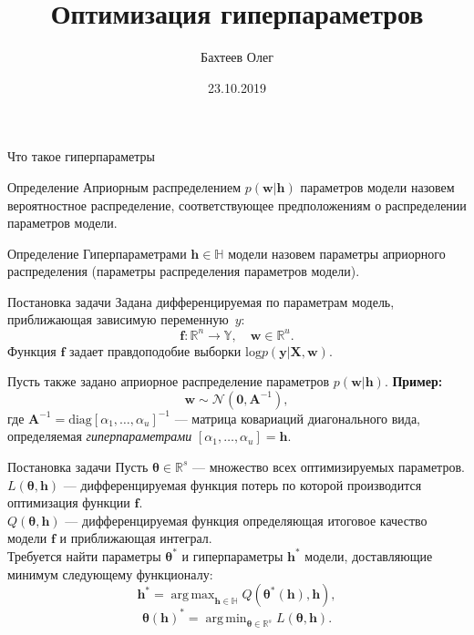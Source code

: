 \documentclass[10pt,pdf,utf8,russian,aspectratio=169]{beamer}
\title[Оптимизация гиперпараметров]{Оптимизация гиперпараметров}
\author{Бахтеев Олег}
\institute{МФТИ}
\date{23.10.2019}
\DeclareMathOperator*{\argmin}{arg\,min}
\DeclareMathOperator*{\argmax}{arg\,max}
\begin{document}
\begin{frame}
  \titlepage
\end{frame}


\begin{frame}{Что такое гиперпараметры}
\begin{block}{Определение}
Априорным распределением $p(\mathbf{w}|\mathbf{h})$ параметров модели назовем вероятностное распределение, соответствующее предположениям о
распределении параметров модели.
\end{block}

\begin{block}{Определение}
Гиперпараметрами $\mathbf{h} \in \mathbb{H}$ модели назовем параметры априорного распределения (параметры распределения параметров модели).
\end{block}

\end{frame}

\begin{frame}{Постановка задачи}
Задана дифференцируемая по параметрам модель, приближающая зависимую переменную~$y$:
\[
	\mathbf{f}:\mathbb{R}^n \to \mathbb{Y}, \quad \mathbf{w} \in \mathbb{R}^u.
\]
Функция $\mathbf{f}$ задает правдоподобие выборки $\text{log}p(\mathbf{y}|\mathbf{X}, \mathbf{w})$. 

Пусть также задано априорное распределение параметров $p(\mathbf{w}|\mathbf{h})$.
\vspace{1cm}
\textbf{Пример:}
 $$\mathbf{w} \sim \mathcal{N}(\mathbf{0}, \mathbf{A}^{-1}),$$
где $\mathbf{A}^{-1} = \text{diag}[\alpha_1, \dots, \alpha_u]^{-1}$ --- матрица ковариаций диагонального вида, определяемая \textit{гиперпараметрами} $[\alpha_1, \dots, \alpha_u] = \mathbf{h}$. 
\end{frame}

\begin{frame}{Постановка задачи}
Пусть $\boldsymbol{\theta} \in \mathbb{R}^s$ --- множество всех оптимизируемых параметров.\\
$L(\boldsymbol{\theta},\mathbf{h})$ ---  дифференцируемая функция потерь  по которой производится оптимизация функции $\mathbf{f}$. \\
$Q(\boldsymbol{\theta},\mathbf{h})$ ---  дифференцируемая функция определяющая итоговое качество модели $\mathbf{f}$ и приближающая интеграл.\\

Требуется найти параметры ${\boldsymbol{\theta}}^{*}$ и гиперпараметры ${\mathbf{h}}^{*}$ модели, доставляющие минимум следующему функционалу:
\[
{\mathbf{h}}^{*} = \argmax_{\mathbf{h} \in \mathbb{H}} Q({\boldsymbol{\theta}^{*}}(\mathbf{h}), \mathbf{h}),
\]
\[
	{\boldsymbol{\theta}}(\mathbf{h})^{*} =  \argmin_{\boldsymbol{\theta} \in \mathbb{R}^s} L(\boldsymbol{\theta}, \mathbf{h}).
\]
\end{frame}
\end{document}
